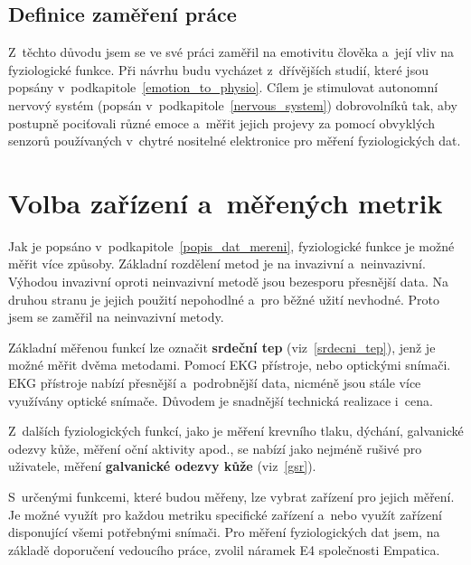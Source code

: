     \subsection{Definice zaměření práce}
    Z~těchto důvodu jsem se ve své práci zaměřil na emotivitu člověka a~její vliv na fyziologické funkce. Při návrhu budu vycházet z~dřívějších studií, které jsou popsány v~podkapitole~\ref{emotion_to_physio}. Cílem je stimulovat autonomní nervový systém (popsán v~podkapitole~\ref{nervous_system}) dobrovolníků tak, aby postupně pociťovali různé emoce a~měřit jejich projevy za pomocí obvyklých senzorů používaných v~chytré nositelné elektronice pro měření fyziologických dat.
    
     
    \section{Volba zařízení a~měřených metrik}
    \label{volba_zarizeni_metriky}
    Jak je popsáno v~podkapitole~\ref{popis_dat_mereni}, fyziologické funkce je možné měřit více způsoby. Základní rozdělení metod je na invazivní a~neinvazivní. Výhodou invazivní oproti neinvazivní metodě jsou bezesporu přesnější data. Na druhou stranu je jejich použití nepohodlné a~pro běžné užití nevhodné. Proto jsem se zaměřil na neinvazivní metody.
    
    Základní měřenou funkcí lze označit \textbf{srdeční tep} (viz~\ref{srdecni_tep}), jenž je možné měřit dvěma metodami. Pomocí EKG přístroje, nebo optickými snímači. EKG přístroje nabízí přesnější a~podrobnější data, nicméně jsou stále více využívány optické snímače. Důvodem je snadnější technická realizace i~cena. 
    
    Z~dalších fyziologických funkcí, jako je měření krevního tlaku, dýchání, galvanické odezvy kůže, měření oční aktivity apod., se nabízí jako nejméně rušivé pro uživatele, měření \textbf{galvanické odezvy kůže} (viz~\ref{gsr}).
    
    S~určenými funkcemi, které budou měřeny, lze vybrat zařízení pro jejich měření. Je možné využít pro každou metriku specifické zařízení a~nebo využít zařízení disponující všemi potřebnými snímači. Pro měření fyziologických dat jsem, na základě doporučení vedoucího práce, zvolil náramek E4 společnosti Empatica. 
    
